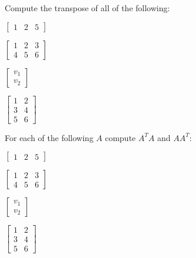 \begin{exercise}
Compute the transpose of all of the following:\\
\begin{inparaenum}[a)]
\item $\begin{bmatrix} 1 & 2 & 5 \end{bmatrix}$ \hfill
\item $\begin{bmatrix} 1 & 2 & 3 \\ 4 & 5 & 6 \end{bmatrix}$ \hfill {} \\
\item $\begin{bmatrix} v_1 \\ v_2 \end{bmatrix}$ \hfill
\item $\begin{bmatrix} 1 & 2 \\ 3 & 4 \\ 5 & 6 \end{bmatrix}$ \hfill {} \\
\end{inparaenum}
\end{exercise}

\begin{exercise}
For each of the following $A$ compute $A^TA$ and $AA^T$:\\
\begin{inparaenum}[a)]
\item $\begin{bmatrix} 1 & 2 & 5 \end{bmatrix}$ \hfill
\item $\begin{bmatrix} 1 & 2 & 3 \\ 4 & 5 & 6 \end{bmatrix}$ \hfill {} \\
\item $\begin{bmatrix} v_1 \\ v_2 \end{bmatrix}$ \hfill
\item $\begin{bmatrix} 1 & 2 \\ 3 & 4 \\ 5 & 6 \end{bmatrix}$ \hfill {} \\
\end{inparaenum}
\end{exercise}

